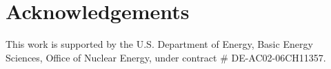 \section{Acknowledgements}
This work is supported by the U.S. Department of Energy, Basic Energy Sciences, 
Office of Nuclear Energy, under contract \# DE-AC02-06CH11357.
